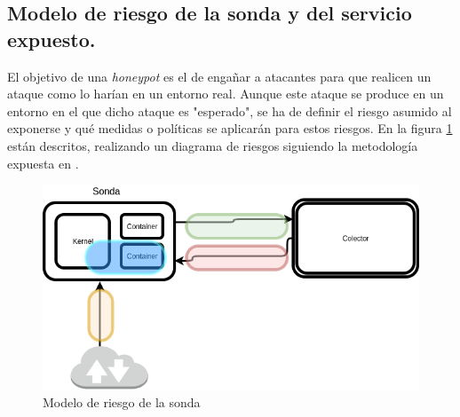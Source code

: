 \subsection{Modelo de riesgo de la sonda y del servicio expuesto.}
\label{subsec:riesgos}

El objetivo de una  \emph{honeypot} es el de engañar a atacantes para que realicen un ataque como lo harían en un entorno real. Aunque este ataque se produce en un entorno en el que dicho ataque es "esperado", se ha de definir el riesgo asumido al exponerse y qué medidas o políticas se aplicarán para estos riesgos. En la figura \ref{fig:riesgo_sonda} están descritos, realizando un diagrama de riesgos siguiendo la metodología expuesta en \cite{Shostack:2014:TMD:2829295}.

\begin{figure}[!h]
  \centering
    \includegraphics[scale=0.4]{images/threat_model_probe}
  \caption{Modelo de riesgo de la sonda}
  \label{fig:riesgo_sonda}
\end{figure}

